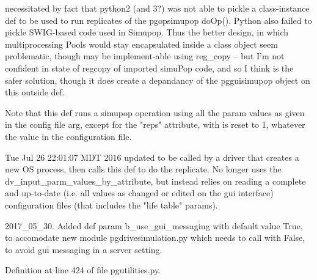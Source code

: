 \begin{DoxyVerb}necessitated by fact that python2 (and 3?) was not able to pickle 
a class-instance def to be used to run replicates of the pgopsimupop
doOp().  Python also failed to pickle SWIG-based code used in Simupop.
Thus the better design, in which  multiprocessing Pools would stay  encapsulated 
inside a class object seem problematic, though may be implement-able using 
reg_copy -- but I'm not confident in state of regcopy of imported simuPop code,
and so  I think is the safer solution, though it
does create a depandancy of the pgguisimupop object on this outside def.  

Note that this def runs a simupop operation using all the param values as
given in the config file arg, except for the "reps" attribute, with is reset to 1,
whatever the value in the configuration file.

Tue Jul 26 22:01:07 MDT 2016
updated to be called by a driver that creates a new OS process, then calls this def to do the replicate.  No longer
uses the dv_input_parm_values_by_attribute, but instead relies on reading a complete and up-to-date (i.e. all values
as changed or edited on the gui interface) configuration files (that includes the "life table" params).

2017_05_30. Added def param b_use_gui_messaging with default value True, to accomodate new
module pgdrivesimulation.py which needs to call with False, to avoid gui messaging in
a server setting.
\end{DoxyVerb}
 

Definition at line 424 of file pgutilities.\+py.



